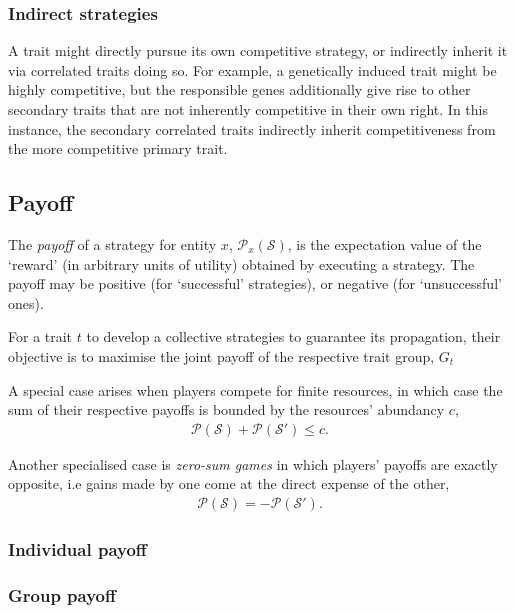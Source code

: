\documentclass[aps,rmp,twocolumn,amsmath,amssymb,nofootinbib,superscriptaddress]{revtex4}
\begin{document}
\subsubsection{Indirect strategies}

A trait might directly pursue its own competitive strategy, or indirectly inherit it via correlated traits doing so. For example, a genetically induced trait might be highly competitive, but the responsible genes additionally give rise to other secondary traits that are not inherently competitive in their own right. In this instance, the secondary correlated traits indirectly inherit competitiveness from the more competitive primary trait.

\subsection{Payoff}

The \textit{payoff} of a strategy for entity $x$, $\mathcal{P}_x(\mathcal{S})$, is the expectation value of the `reward' (in arbitrary units of utility) obtained by executing a strategy. The payoff may be positive (for `successful' strategies), or negative (for `unsuccessful' ones).

For a trait $t$ to develop a collective strategies to guarantee its propagation, their objective is to maximise the joint payoff of the respective trait group, $G_t$

A special case arises when players compete for finite resources, in which case the sum of their respective payoffs is bounded by the resources' abundancy $c$,
\begin{align}
	\mathcal{P}(\mathcal{S}) + \mathcal{P}(\mathcal{S}') \leq c.
\end{align}

Another specialised case is \textit{zero-sum games} in which players' payoffs are exactly opposite, i.e gains made by one come at the direct expense of the other,
\begin{align}
\mathcal{P}(\mathcal{S}) = -\mathcal{P}(\mathcal{S}').
\end{align}

\subsubsection{Individual payoff}

\subsubsection{Group payoff}
\end{document}
